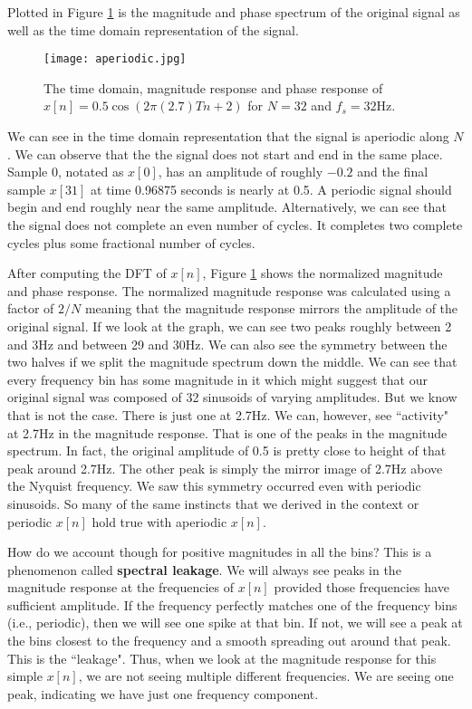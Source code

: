 Plotted in Figure \ref{fig:aperiodicGraph} is the magnitude and phase spectrum of the original signal as well as the time 
domain representation of the signal.  

\begin{figure}[h]
	\caption{The time domain, magnitude response and phase response of $x[n] = 0.5\cos(2\pi (2.7)Tn + 2)$
	for $N = 32$ and $f_s = 32$Hz.}
	\label{fig:aperiodicGraph}
	\begin{center}
		\texttt{[image: aperiodic.jpg]}
	\end{center}
\end{figure}

We can see in the time domain representation that the signal is aperiodic along $N$.  We can observe that the the signal
does not start and end in the same place.  Sample 0, notated as $x[0]$, has an amplitude of roughly $-0.2$ and the 
final sample $x[31]$ at time 0.96875 seconds is nearly at 0.5.  A periodic signal should begin and end roughly near 
the same amplitude.  Alternatively, we can see that the signal does not complete an even number of cycles.  It completes
two complete cycles plus some fractional number of cycles.  

After computing the DFT of $x[n]$, Figure \ref{fig:aperiodicGraph} shows the normalized magnitude and phase response.
The normalized magnitude response was calculated using a factor of $2/N$ meaning that the magnitude response
mirrors the amplitude of the original signal.  If we look at the graph, we can see two peaks roughly between 2 and 3Hz
and between 29 and 30Hz.  We can also see the symmetry between the two halves if we split the magnitude spectrum
down the middle.  We can see that every frequency bin has some magnitude in it which might suggest that our original
signal was composed of 32 sinusoids of varying amplitudes.  But we know that is not the case.  There is just one at
2.7Hz.  We can, however, see ``activity" at 2.7Hz in the magnitude response.  That is one of the peaks in the magnitude
spectrum.  In fact, the original amplitude of 0.5 is pretty close to height of that peak around 2.7Hz.  The other peak
is simply the mirror image of 2.7Hz above the Nyquist frequency.  We saw this symmetry occurred even with periodic
sinusoids.  So many of the same instincts that we derived in the context or periodic $x[n]$ hold true with aperiodic 
$x[n]$. 

How do we account though for positive magnitudes in all the bins?  This is a phenomenon called \textbf{spectral leakage}.  
We will always see peaks in the magnitude response at the frequencies of $x[n]$ provided those frequencies have
sufficient amplitude.  If the frequency perfectly matches one of the frequency bins (i.e., periodic), then we will see
one spike at that bin.  If not, we will see a peak at the bins closest to the frequency and a smooth spreading out 
around that peak.  This is the ``leakage".  Thus, when we look at the magnitude response for this simple $x[n]$, we
are not seeing multiple different frequencies.  We are seeing one peak, indicating we have just one frequency component.

